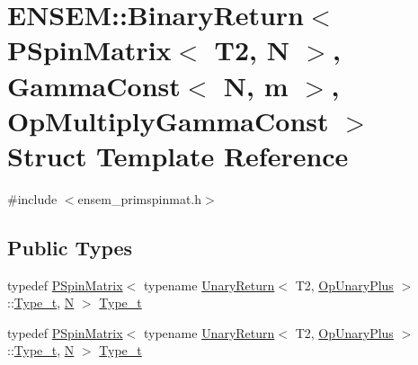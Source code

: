 \hypertarget{structENSEM_1_1BinaryReturn_3_01PSpinMatrix_3_01T2_00_01N_01_4_00_01GammaConst_3_01N_00_01m_01_4_00_01OpMultiplyGammaConst_01_4}{}\section{E\+N\+S\+EM\+:\+:Binary\+Return$<$ P\+Spin\+Matrix$<$ T2, N $>$, Gamma\+Const$<$ N, m $>$, Op\+Multiply\+Gamma\+Const $>$ Struct Template Reference}
\label{structENSEM_1_1BinaryReturn_3_01PSpinMatrix_3_01T2_00_01N_01_4_00_01GammaConst_3_01N_00_01m_01_4_00_01OpMultiplyGammaConst_01_4}


{\ttfamily \#include $<$ensem\+\_\+primspinmat.\+h$>$}

\subsection*{Public Types}
\begin{DoxyCompactItemize}
\item 
typedef \mbox{\hyperlink{classENSEM_1_1PSpinMatrix}{P\+Spin\+Matrix}}$<$ typename \mbox{\hyperlink{structENSEM_1_1UnaryReturn}{Unary\+Return}}$<$ T2, \mbox{\hyperlink{structENSEM_1_1OpUnaryPlus}{Op\+Unary\+Plus}} $>$\+::\mbox{\hyperlink{structENSEM_1_1BinaryReturn_3_01PSpinMatrix_3_01T2_00_01N_01_4_00_01GammaConst_3_01N_00_01m_01_4_00_01OpMultiplyGammaConst_01_4_a74bdb4213c719759fc970c718691980d}{Type\+\_\+t}}, \mbox{\hyperlink{operator__name__util_8cc_a7722c8ecbb62d99aee7ce68b1752f337}{N}} $>$ \mbox{\hyperlink{structENSEM_1_1BinaryReturn_3_01PSpinMatrix_3_01T2_00_01N_01_4_00_01GammaConst_3_01N_00_01m_01_4_00_01OpMultiplyGammaConst_01_4_a74bdb4213c719759fc970c718691980d}{Type\+\_\+t}}
\item 
typedef \mbox{\hyperlink{classENSEM_1_1PSpinMatrix}{P\+Spin\+Matrix}}$<$ typename \mbox{\hyperlink{structENSEM_1_1UnaryReturn}{Unary\+Return}}$<$ T2, \mbox{\hyperlink{structENSEM_1_1OpUnaryPlus}{Op\+Unary\+Plus}} $>$\+::\mbox{\hyperlink{structENSEM_1_1BinaryReturn_3_01PSpinMatrix_3_01T2_00_01N_01_4_00_01GammaConst_3_01N_00_01m_01_4_00_01OpMultiplyGammaConst_01_4_a74bdb4213c719759fc970c718691980d}{Type\+\_\+t}}, \mbox{\hyperlink{operator__name__util_8cc_a7722c8ecbb62d99aee7ce68b1752f337}{N}} $>$ \mbox{\hyperlink{structENSEM_1_1BinaryReturn_3_01PSpinMatrix_3_01T2_00_01N_01_4_00_01GammaConst_3_01N_00_01m_01_4_00_01OpMultiplyGammaConst_01_4_a74bdb4213c719759fc970c718691980d}{Type\+\_\+t}}
\end{DoxyCompactItemize}


